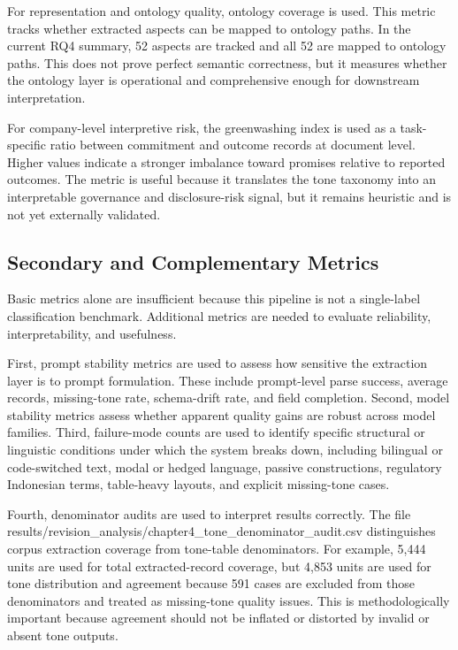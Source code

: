 \documentclass[english, online, cse, master]{dithesis}
\begin{document}
For representation and ontology quality, ontology coverage is used. This metric tracks whether extracted aspects can be mapped to ontology paths. In the current RQ4 summary, 52 aspects are tracked and all 52 are mapped to ontology paths. This does not prove perfect semantic correctness, but it measures whether the ontology layer is operational and comprehensive enough for downstream interpretation.

For company-level interpretive risk, the greenwashing index is used as a task-specific ratio between commitment and outcome records at document level. Higher values indicate a stronger imbalance toward promises relative to reported outcomes. The metric is useful because it translates the tone taxonomy into an interpretable governance and disclosure-risk signal, but it remains heuristic and is not yet externally validated.

\subsection{Secondary and Complementary Metrics}

Basic metrics alone are insufficient because this pipeline is not a single-label classification benchmark. Additional metrics are needed to evaluate reliability, interpretability, and usefulness.

First, prompt stability metrics are used to assess how sensitive the extraction layer is to prompt formulation. These include prompt-level parse success, average records, missing-tone rate, schema-drift rate, and field completion. Second, model stability metrics assess whether apparent quality gains are robust across model families. Third, failure-mode counts are used to identify specific structural or linguistic conditions under which the system breaks down, including bilingual or code-switched text, modal or hedged language, passive constructions, regulatory Indonesian terms, table-heavy layouts, and explicit missing-tone cases.

Fourth, denominator audits are used to interpret results correctly. The file results/revision\_analysis/chapter4\_tone\_denominator\_audit.csv distinguishes corpus extraction coverage from tone-table denominators. For example, 5,444 units are used for total extracted-record coverage, but 4,853 units are used for tone distribution and agreement because 591 cases are excluded from those denominators and treated as missing-tone quality issues. This is methodologically important because agreement should not be inflated or distorted by invalid or absent tone outputs.
\end{document}
